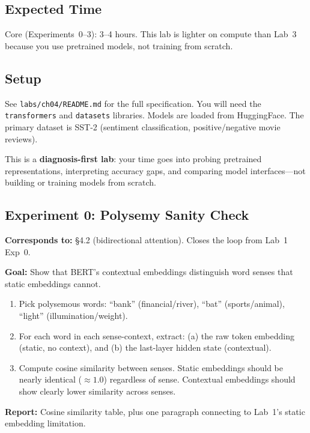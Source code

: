 \subsection*{Expected Time}

Core (Experiments~0--3): 3--4 hours. This lab is lighter on compute than Lab~3 because you use pretrained models, not training from scratch.

\subsection*{Setup}

See \texttt{labs/ch04/README.md} for the full specification. You will need the \texttt{transformers} and \texttt{datasets} libraries. Models are loaded from HuggingFace. The primary dataset is SST-2 (sentiment classification, positive/negative movie reviews).

\noindent This is a \textbf{diagnosis-first lab}: your time goes into probing pretrained representations, interpreting accuracy gaps, and comparing model interfaces---not building or training models from scratch.

\subsection*{Experiment 0: Polysemy Sanity Check}

\textbf{Corresponds to:} \S4.2 (bidirectional attention). Closes the loop from Lab~1 Exp~0.

\textbf{Goal:} Show that BERT's contextual embeddings distinguish word senses that static embeddings cannot.

\begin{enumerate}[nosep]
    \item Pick polysemous words: ``bank'' (financial/river), ``bat'' (sports/animal), ``light'' (illumination/weight).
    \item For each word in each sense-context, extract: (a) the raw token embedding (static, no context), and (b) the last-layer hidden state (contextual).
    \item Compute cosine similarity between senses. Static embeddings should be nearly identical ($\approx 1.0$) regardless of sense. Contextual embeddings should show clearly lower similarity across senses.
\end{enumerate}

\textbf{Report:} Cosine similarity table, plus one paragraph connecting to Lab~1's static embedding limitation.

